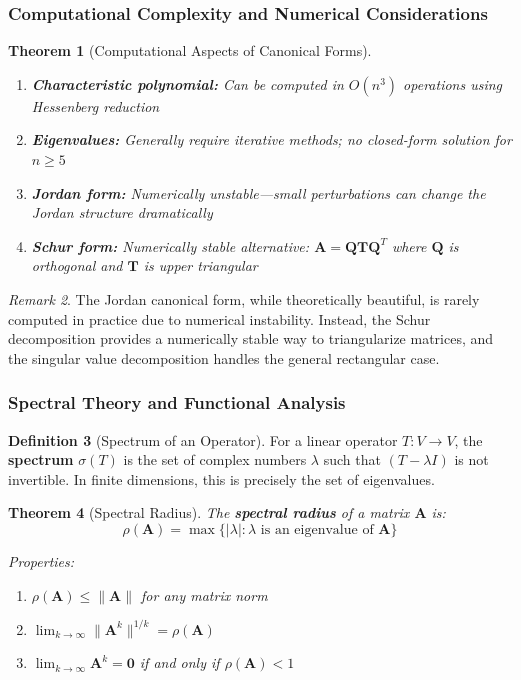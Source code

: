\documentclass[12pt]{article}
\numberwithin{equation}{section}
\newcommand{\mat}[1]{\mathbf{#1}}        %
\theoremstyle{plain}
\newtheorem{theorem}{Theorem}[section]
\theoremstyle{definition}
\newtheorem{definition}[theorem]{Definition}
\theoremstyle{remark}
\newtheorem{remark}[theorem]{Remark}
\begin{document}
\subsubsection{Computational Complexity and Numerical Considerations}

\begin{theorem}[Computational Aspects of Canonical Forms]
\begin{enumerate}
\item \textbf{Characteristic polynomial:} Can be computed in $O(n^3)$ operations using Hessenberg reduction
\item \textbf{Eigenvalues:} Generally require iterative methods; no closed-form solution for $n \geq 5$
\item \textbf{Jordan form:} Numerically unstable—small perturbations can change the Jordan structure dramatically
\item \textbf{Schur form:} Numerically stable alternative: $\mat{A} = \mat{Q}\mat{T}\mat{Q}^T$ where $\mat{Q}$ is orthogonal and $\mat{T}$ is upper triangular
\end{enumerate}
\end{theorem}

\begin{remark}
The Jordan canonical form, while theoretically beautiful, is rarely computed in practice due to numerical instability. Instead, the Schur decomposition provides a numerically stable way to triangularize matrices, and the singular value decomposition handles the general rectangular case.
\end{remark}

\subsubsection{Spectral Theory and Functional Analysis}

\begin{definition}[Spectrum of an Operator]
For a linear operator $T: V \to V$, the \textbf{spectrum} $\sigma(T)$ is the set of complex numbers $\lambda$ such that $(T - \lambda I)$ is not invertible. In finite dimensions, this is precisely the set of eigenvalues.
\end{definition}

\begin{theorem}[Spectral Radius]
The \textbf{spectral radius} of a matrix $\mat{A}$ is:
$$\rho(\mat{A}) = \max\{|\lambda| : \lambda \text{ is an eigenvalue of } \mat{A}\}$$

Properties:
\begin{enumerate}
\item $\rho(\mat{A}) \leq \|\mat{A}\|$ for any matrix norm
\item $\lim_{k \to \infty} \|\mat{A}^k\|^{1/k} = \rho(\mat{A})$
\item $\lim_{k \to \infty} \mat{A}^k = \mat{0}$ if and only if $\rho(\mat{A}) < 1$
\end{enumerate}
\end{theorem}
\end{document}
